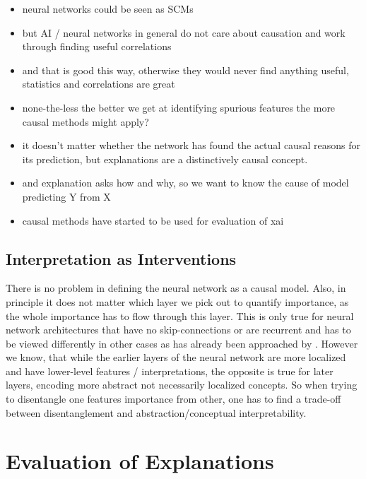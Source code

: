 \begin{itemize}
    
    \item neural networks could be seen as SCMs \cite{Chattopadhyay2019}
    \item but AI / neural networks in general do not care about causation and work through finding useful correlations
    \item and that is good this way, otherwise they would never find anything useful, statistics and correlations are great
    \item none-the-less the better we get at identifying spurious features the more causal methods might apply?
    \item it doesn't matter whether the network has found the actual causal reasons for its prediction, but explanations are a distinctively causal concept.
    \item and explanation asks how and why, so we want to know the cause of model predicting Y from X
    \item causal methods have started to be used for evaluation of xai
\end{itemize}

\subsection{Interpretation as Interventions}
There is no problem in defining the neural network as a causal model. 
Also, in principle it does not matter which layer we pick out to quantify importance, as the whole importance has to flow through this layer. This is only true for neural network architectures that have no skip-connections or are recurrent and has to be viewed differently in other cases as has already been approached by \cite{Chattopadhyay2019}. However we know, that while the earlier layers of the neural network are more localized and have lower-level features / interpretations, the opposite is true for later layers, encoding more abstract not necessarily localized concepts. 
So when trying to disentangle one features importance from other, one has to find a trade-off between disentanglement and abstraction/conceptual interpretability.
 


\section{Evaluation of Explanations}
